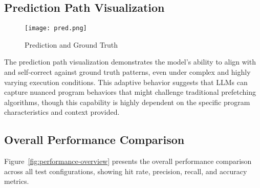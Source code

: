 \documentclass[sigconf,authorversion,nonacm]{acmart}
\begin{document}
\subsection{Prediction Path Visualization}

\begin{figure}[H]
  \texttt{[image: pred.png]}
  \caption{Prediction and Ground Truth}
  \label{fig:predPath}
\end{figure}

The prediction path visualization demonstrates the model's ability to align with and self-correct against ground truth patterns, even under complex and highly varying execution conditions. This adaptive behavior suggests that LLMs can capture nuanced program behaviors that might challenge traditional prefetching algorithms, though this capability is highly dependent on the specific program characteristics and context provided.


\subsection{Overall Performance Comparison}
Figure~\ref{fig:performance-overview} presents the overall performance comparison across all test configurations, showing hit rate, precision, recall, and accuracy metrics.











\end{document}
